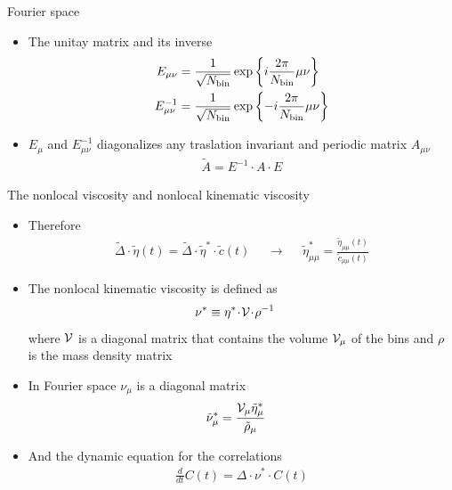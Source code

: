 \documentclass{beamer}
\newcommand{\esc}{\!\cdot\!}
\newcommand{\llangle}{\left\langle}
\newcommand{\rrangle}{\right\rangle}
\begin{document}
\begin{frame}{Fourier space}
  \begin{itemize}
    \item The unitay matrix and its inverse
\begin{align}
  E_{\mu\nu}&=\frac{1}{\sqrt{N_{\rm bin}}}\exp\left\{i\frac{2\pi}{N_{\rm bin}}\mu\nu\right\}
  \nonumber \\
  E^{-1}_{\mu\nu}&=\frac{1}{\sqrt{N_{\rm bin}}}\exp\left\{-i\frac{2\pi}{N_{\rm bin}}\mu\nu\right\}
\nonumber
\end{align} 
    \item $E_{\mu}$ and $E_{\mu\nu}^{-1}$ diagonalizes any traslation invariant and periodic matrix $A_{\mu\nu}$
      \begin{align}
      \tilde{A}=E^{-1}\cdot A\cdot E
      \nonumber
    \end{align}
  \end{itemize}
\end{frame}

\begin{frame}{The nonlocal viscosity and nonlocal kinematic viscosity}
  \begin{itemize}
  \item Therefore
\begin{align}
  \tilde{\Delta}\esc \tilde{\eta}(t) =\tilde{\Delta}\esc \tilde{\eta}^*\esc \tilde{c}(t)&& \rightarrow
  &&\tilde{\eta}_{\mu\mu}^*=\frac{\tilde{\eta}_{\mu\mu}(t) }{\tilde{c}_{\mu\mu}(t)}
\nonumber
\end{align}
\item The nonlocal kinematic viscosity is defined as
\begin{align}
\nu^*&\equiv  \eta^*\esc{\cal V}\esc \rho^{-1}
\nonumber
\end{align}
where ${\cal V}$ is a diagonal matrix that contains the volume ${\cal V}_{\mu}$ of the bins and $\rho$ is the mass density matrix
\item In Fourier space $\nu_{\mu}$ is a diagonal matrix
\begin{align}
  \tilde{\nu}_\mu^*&=  \frac{{\cal V}_\mu \tilde{\eta}_\mu^*}{\tilde{\rho}_\mu}
  \nonumber
\end{align}
\item And the dynamic equation for the correlations
  \begin{align}
    \frac{d}{dt}C(t)=\Delta\cdot\nu^*\cdot C(t)
    \nonumber
  \end{align}
 \end{itemize}
 \end{frame}
\end{document}
